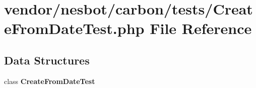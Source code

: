 \section{vendor/nesbot/carbon/tests/\+Create\+From\+Date\+Test.php File Reference}
\label{_create_from_date_test_8php}
\subsection*{Data Structures}
\begin{DoxyCompactItemize}
\item 
class {\bf Create\+From\+Date\+Test}
\end{DoxyCompactItemize}
